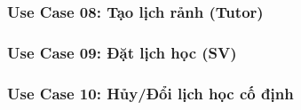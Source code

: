 \newpage
\subsubsection*{Use Case 08: Tạo lịch rảnh (Tutor)}
\begin{samepage}

\end{samepage}


\newpage
\subsubsection*{Use Case 09: Đặt lịch học (SV)}
\begin{samepage}

\end{samepage}


\newpage
\subsubsection*{Use Case 10: Hủy/Đổi lịch học cố định}
\begin{samepage}

\end{samepage}

